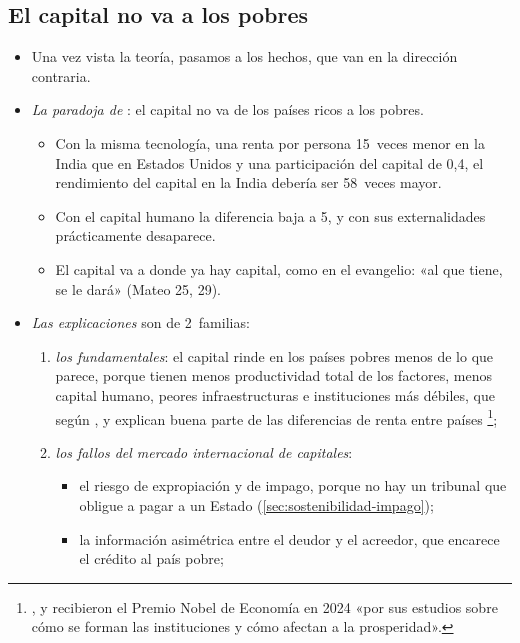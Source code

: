 \documentclass[11pt]{article}
\begin{document}
\subsection{El capital no va a los pobres}\label{sec:lucas}

\begin{itemize}
\item Una vez vista la teoría, pasamos a los hechos, que van en la dirección contraria.
\item \emph{La paradoja de }: el capital no va de los países ricos a los pobres\nocite{Lucas1990Why}.
  \begin{itemize}
  \item Con la misma tecnología, una renta por persona 15~veces menor en la India que en Estados Unidos y una participación del capital de 0,4, el rendimiento del capital en la India debería ser 58~veces mayor.
  \item Con el capital humano la diferencia baja a 5, y con sus externalidades prácticamente desaparece.
  \item El capital va a donde ya hay capital, como en el evangelio: «al que tiene, se le dará» (Mateo 25, 29).
  \end{itemize}
\item \emph{Las explicaciones} son de 2~familias:
  \begin{enumerate}
  \item \emph{los fundamentales}: el capital rinde en los países pobres menos de lo que parece, porque tienen menos productividad total de los factores, menos capital humano, peores infraestructuras e instituciones más débiles, que según ,  y  explican buena parte de las diferencias de renta entre países \footnote{,  y  recibieron el Premio Nobel de Economía en 2024 «por sus estudios sobre cómo se forman las instituciones y cómo afectan a la prosperidad»\nocite{NobelPrize2024}.};
  \item \emph{los fallos del mercado internacional de capitales}:
    \begin{itemize}
    \item el riesgo de expropiación y de impago, porque no hay un tribunal que obligue a pagar a un Estado (\ref{sec:sostenibilidad-impago});
    \item la información asimétrica entre el deudor y el acreedor, que encarece el crédito al país pobre\nocite{GertlerRogoff1990};

\end{itemize}
\end{enumerate}
\end{itemize}
\end{document}
